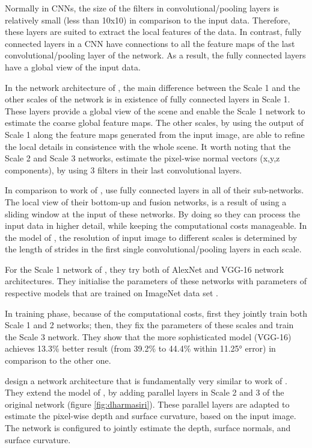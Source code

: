 Normally in CNNs, the size of the filters in convolutional/pooling layers is relatively small (less than 10x10) in comparison to the input data. Therefore, these layers are suited to extract the local features of the data. In contrast, fully connected layers in a CNN have connections to all the feature maps of the last convolutional/pooling layer of the network. As a result, the fully connected layers have a global view of the input data. 

In the network architecture of \citeauthor*{eigen}, the main difference between the Scale 1 and the other scales of the network is in existence of fully connected layers in Scale 1. These layers provide a global view of the scene and enable the Scale 1 network to estimate the coarse global feature maps. The other scales, by using the output of Scale 1 along the feature maps generated from the input image, are able to refine the local details in consistence with the whole scene. It worth noting that the Scale 2 and Scale 3 networks, estimate the pixel-wise normal vectors (x,y,z components), by using 3 filters in their last convolutional layers. 

In comparison to work of \citeauthor*{eigen}, \citeauthor*{wang} use fully connected layers in all of their sub-networks. The local view of their bottom-up and fusion networks, is a result of using a sliding window at the input of these networks. By doing so they can process the input data in higher detail, while keeping the computational costs manageable. In the model of \citeauthor*{eigen}, the resolution of input image to different scales is determined by the length of strides in the first single convolutional/pooling layers in each scale. 

For the Scale 1 network of \citeauthor*{eigen}, they try both of AlexNet \cite{alexnet} and VGG-16 \cite{vgg} network architectures. They initialise the parameters of these networks with parameters of respective models that are trained on ImageNet data set \cite{imagenet}. 

In training phase, because of the computational costs, first they jointly train both Scale 1 and 2 networks; then, they fix the parameters of these scales and train the Scale 3 network. They show that the more sophisticated model (VGG-16) achieves 13.3\% better result (from 39.2\% to 44.4\% within \ang{11.25} error) in comparison to the other one. 

\pagebreak

\citeauthor*{dharmasiri} \cite{dharmasiri} design a network architecture that is fundamentally very similar to work of \citeauthor*{eigen}. They extend the model of \citeauthor*{eigen}, by adding parallel layers in Scale 2 and 3 of the original network (figure \ref{fig:dharmasiri}). These parallel layers are adapted to estimate the pixel-wise depth and surface curvature, based on the input image. The network is configured to jointly estimate the depth, surface normals, and surface curvature. 

